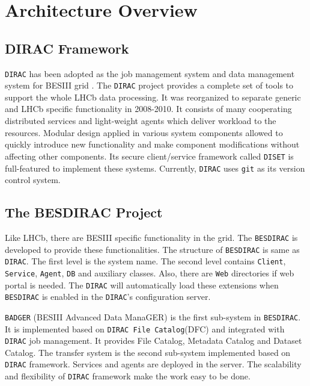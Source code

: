 \section{Architecture Overview}

\subsection{DIRAC Framework}

{\tt DIRAC} \cite{bib:dirac3,bib:diracgit} 
has been adopted as the job management system and data management
system for BESIII grid \cite{bib:besdfc}. 
The {\tt DIRAC} project provides a 
complete set of tools to support the whole LHCb data processing.
It was reorganized to separate generic and LHCb specific functionality
in 2008-2010.
%
It consists of many cooperating distributed services and light-weight
agents which deliver workload to the resources.
Modular design applied in various system components allowed to quickly
introduce new functionality and make component modifications without
affecting other components.
Its secure client/service framework called {\tt DISET} \cite{bib:diset} 
is full-featured to implement these systems.
Currently, {\tt DIRAC} uses {\tt git} as its version control system.

\subsection{The BESDIRAC Project}

Like LHCb, there are BESIII specific functionality in the grid.
The {\tt BESDIRAC} \cite{bib:besdirac} 
is developed to provide these functionalities.
The structure of {\tt BESDIRAC} is same as {\tt DIRAC}.
The first level is the system name. The second level contains
{\tt Client}, {\tt Service}, {\tt Agent}, {\tt DB} and auxiliary classes.
Also, there are {\tt Web} directories if web portal is needed.
The {\tt DIRAC} will automatically load these extensions when 
{\tt BESDIRAC} is enabled in the {\tt DIRAC}'s configuration server.

{\tt BADGER} (BESIII Advanced Data ManaGER) is the first sub-system
in {\tt BESDIRAC}. It is implemented based on {\tt DIRAC File Catalog}(DFC)
and integrated with {\tt DIRAC} job management.
It provides File Catalog, Metadata Catalog and Dataset Catalog.
%
The transfer system is the second sub-system implemented based on
{\tt DIRAC} framework. Services and agents are deployed in the server.
The scalability and flexibility of {\tt DIRAC} framework make the work
easy to be done. 

